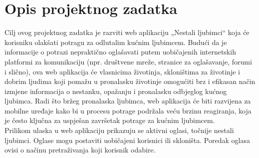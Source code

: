 \chapter{Opis projektnog zadatka}
		
		
		Cilj ovog projektnog zadatka je razviti web aplikaciju „Nestali ljubimci“ koja će korisniku olakšati potragu za odlutalim kućnim ljubimcem. Budući da je informacije o potrazi nepraktično oglašavati putem uobičajenih internetskih platformi za komunikaciju (npr. društvene mreže, stranice za oglašavanje, forumi i slično), ova web aplikacija će vlasnicima životinja, skloništima za životinje i dobrim ljudima koji pomažu u pronalasku životinje omogućiti brz i efikasan način izmjene informacija o nestanku, opažanju i pronalasku odbjeglog kućnog ljubimca. Radi što bržeg pronalaska ljubimca, web aplikacija će biti razvijena za mobilne uređaje kako bi u procesu potrage podržala veću brzinu reagiranja, koja je često ključna za uspješan završetak potrage za kućnim ljubimcem.\\
		
		Prilikom ulaska u web aplikaciju prikazuju se aktivni oglasi, točnije nestali ljubimci. Oglase mogu postaviti uobičajeni korisnici ili skloništa. Poredak oglasa ovisi o načinu pretraživanja koji korisnik odabire. \\
		
